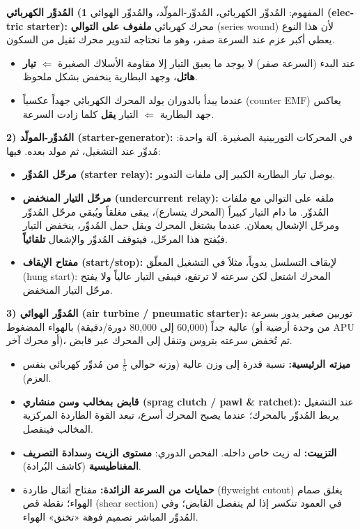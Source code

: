 \documentclass[11pt,a4paper]{article}
\newcommand{\en}[1]{\textenglish{#1}}
\begin{document}
\begin{concept}{المفهوم: المُدوِّر الكهربائي، المُدوِّر-المولّد، والمُدوِّر الهوائي}
\textbf{1) المُدوِّر الكهربائي (\en{electric starter}):} محرك كهربائي \textbf{ملفوف على التوالي} (\en{series wound}) لأن هذا النوع يعطي أكبر عزم عند السرعة صفر، وهو ما نحتاجه لتدوير محرك ثقيل من السكون.
\begin{itemize}
  \item عند البدء (السرعة صفر) لا يوجد ما يعيق التيار إلا مقاومة الأسلاك الصغيرة $\Leftarrow$ \textbf{تيار هائل}، وجهد البطارية ينخفض بشكل ملحوظ.
  \item عندما يبدأ بالدوران يولد المحرك الكهربائي جهداً عكسياً (\en{counter EMF}) يعاكس جهد البطارية $\Leftarrow$ التيار \textbf{يقل} كلما زادت السرعة.
\end{itemize}

\textbf{2) المُدوِّر-المولّد (\en{starter-generator}):} في المحركات التوربينية الصغيرة. آلة واحدة: مُدوِّر عند التشغيل، ثم مولد بعده. فيها:
\begin{itemize}
  \item \textbf{مرحّل المُدوِّر (\en{starter relay}):} يوصل تيار البطارية الكبير إلى ملفات التدوير.
  \item \textbf{مرحّل التيار المنخفض (\en{undercurrent relay}):} ملفه على التوالي مع ملفات المُدوِّر. ما دام التيار كبيراً (المحرك يتسارع)، يبقى مغلقاً ويُبقي مرحّل المُدوِّر ومرحّل الإشعال يعملان. عندما يشتغل المحرك ويقل حمل المُدوِّر، ينخفض التيار فيُفتح هذا المرحّل، فيتوقف المُدوِّر والإشعال \textbf{تلقائياً}.
  \item \textbf{مفتاح الإيقاف (\en{start/stop}):} لإيقاف التسلسل يدوياً، مثلاً في التشغيل المعلّق (\en{hung start}): المحرك اشتعل لكن سرعته لا ترتفع، فيبقى التيار عالياً ولا يفتح مرحّل التيار المنخفض.
\end{itemize}

\textbf{3) المُدوِّر الهوائي (\en{air turbine / pneumatic starter}):} توربين صغير يدور بسرعة عالية جداً (60,000 إلى 80,000 دورة/دقيقة) بالهواء المضغوط (من وحدة أرضية أو \en{APU} أو محرك آخر)، ثم تُخفض سرعته بتروس وتنقل إلى المحرك عبر قابض.
\begin{itemize}
  \item \textbf{ميزته الرئيسية:} نسبة قدرة إلى وزن عالية (وزنه حوالي $\frac{1}{5}$ من مُدوِّر كهربائي بنفس العزم).
  \item \textbf{قابض بمخالب وسن منشاري (\en{sprag clutch / pawl \& ratchet}):} عند التشغيل يربط المُدوِّر بالمحرك؛ عندما يصبح المحرك أسرع، تبعد القوة الطاردة المركزية المخالب فينفصل.
  \item \textbf{التزييت:} له زيت خاص داخله. الفحص الدوري: \textbf{مستوى الزيت} و\textbf{سدادة التصريف المغناطيسية} (كاشف البُرادة).
  \item \textbf{حمايات من السرعة الزائدة:} مفتاح أثقال طاردة (\en{flyweight cutout}) يغلق صمام الهواء؛ نقطة قص (\en{shear section}) في العمود تنكسر إذا لم ينفصل القابض؛ وفي المُدوِّر المباشر تصميم فوهة «تخنق» الهواء.
\end{itemize}
\end{concept}
\end{document}
